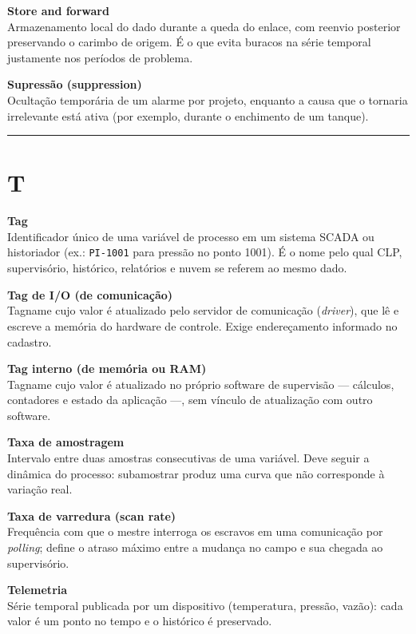 \textbf{Store and forward}\\
Armazenamento local do dado durante a queda do enlace, com reenvio posterior preservando o carimbo de origem. É o que evita buracos na série temporal justamente nos períodos de problema.

\textbf{Supressão (suppression)}\\
Ocultação temporária de um alarme por projeto, enquanto a causa que o tornaria irrelevante está ativa (por exemplo, durante o enchimento de um tanque).

\begin{center}\rule{0.5\linewidth}{0.5pt}\end{center}

\section{T}\label{t}

\textbf{Tag}\\
Identificador único de uma variável de processo em um sistema SCADA ou historiador (ex.: \passthrough{\lstinline!PI-1001!} para pressão no ponto 1001). É o nome pelo qual CLP, supervisório, histórico, relatórios e nuvem se referem ao mesmo dado.

\textbf{Tag de I/O (de comunicação)}\\
Tagname cujo valor é atualizado pelo servidor de comunicação (\emph{driver}), que lê e escreve a memória do hardware de controle. Exige endereçamento informado no cadastro.

\textbf{Tag interno (de memória ou RAM)}\\
Tagname cujo valor é atualizado no próprio software de supervisão --- cálculos, contadores e estado da aplicação ---, sem vínculo de atualização com outro software.

\textbf{Taxa de amostragem}\\
Intervalo entre duas amostras consecutivas de uma variável. Deve seguir a dinâmica do processo: subamostrar produz uma curva que não corresponde à variação real.

\textbf{Taxa de varredura (scan rate)}\\
Frequência com que o mestre interroga os escravos em uma comunicação por \emph{polling}; define o atraso máximo entre a mudança no campo e sua chegada ao supervisório.

\textbf{Telemetria}\\
Série temporal publicada por um dispositivo (temperatura, pressão, vazão): cada valor é um ponto no tempo e o histórico é preservado.

